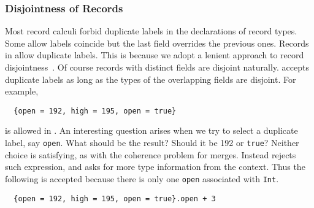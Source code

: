 \begin{comment}
\subsubsection{Restriction via Subtyping}

Unlike most record systems, restriction is not a primitive operation in \name.
Instead, \name uses subtyping for restriction. Combined with disjoint
quantification, we can encode a \lstinline{remove} function that removes a given
field from a record:
\lstinline{remove} takes a value x which contains a record of type
\lstinline${low : Int}$ as well as some extra information of type \lstinline{B}.
The disjointness constraint ensures that the value of type \lstinline{B} does
not contain a record with type \lstinline${low : Int}$. The following examples
shows removing the \lstinline{low} field:
\end{comment}


\subsubsection{Disjointness of Records}

Most record calculi forbid duplicate labels in the declarations of record types.
Some allow labels coincide but the last field overrides the previous ones.
Records in \name allow duplicate labels. This is because we adopt a lenient
approach to record disjointness~\cite{alpuimdisjoint}. Of course records with
distinct fields are disjoint naturally. \name accepts duplicate labels as long
as the types of the overlapping fields are disjoint. For example,
\begin{lstlisting}
  {open = 192, high = 195, open = true}
\end{lstlisting}
is allowed in \name. An interesting question arises when we try to select a
duplicate label, say \lstinline{open}. What should be the result? Should it be
192 or \lstinline{true}? Neither choice is satisfying, as with the coherence
problem for merges. Instead \name rejects such expression, and asks for more
type information from the context. Thus the following is accepted because there
is only one \lstinline{open} associated with \lstinline{Int}.
\begin{lstlisting}
  {open = 192, high = 195, open = true}.open + 3
\end{lstlisting}
